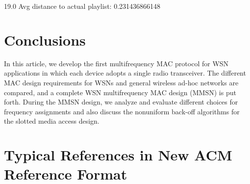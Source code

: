 \documentclass[acmtog]{acmart}
\begin{document}
19.0
Avg distance to actual playlist: 0.231436866148

\section{Conclusions}

In this article, we develop the first multifrequency MAC protocol for
WSN applications in which each device adopts a
single radio transceiver. The different MAC design requirements for
WSNs and general wireless ad-hoc networks are
compared, and a complete WSN multifrequency MAC design (MMSN) is
put forth. During the MMSN design, we analyze and evaluate different
choices for frequency assignments and also discuss the nonuniform
back-off algorithms for the slotted media access design.


\section{Typical References in New ACM Reference Format}
\end{document}
